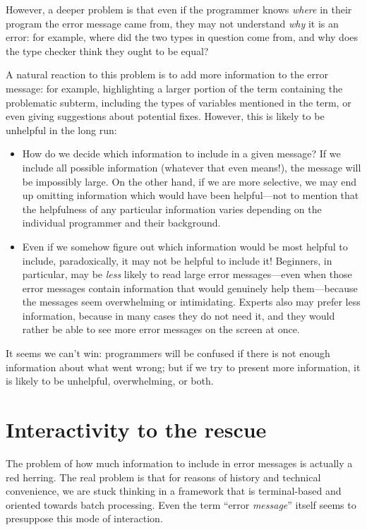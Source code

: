 \documentclass[sigplan, screen]{acmart}\settopmatter{printccs=false,printacmref=false}
\begin{document}
However, a deeper problem is that even if the programmer knows
\emph{where} in their program the error message came from, they may
not understand \emph{why} it is an error: for example, where
did the two types in question come from, and why does the type checker
think they ought to be equal?

A natural reaction to this problem is to add more information to the
error message: for example, highlighting a larger portion of the term
containing the problematic subterm, including the types of variables
mentioned in the term, or even giving suggestions about potential
fixes.  However, this is likely to be unhelpful in the long run:

\begin{itemize}
\item How do we decide which information to include in a given
  message?  If we include all possible information (whatever that even
  means!), the message will be impossibly large. On the other hand, if
  we are more selective, we may end up omitting information which
  would have been helpful---not to mention that the helpfulness of any
  particular information varies depending on the individual programmer
  and their background.
\item Even if we somehow figure out which information would be most
  helpful to include, paradoxically, it may not be helpful to include
  it!  Beginners, in particular, may be \emph{less} likely to read
  large error messages---even when those error messages contain
  information that would genuinely help them---because the messages seem
  overwhelming or intimidating. Experts also may prefer less
  information, because in many cases they do not need it, and they
  would rather be able to see more error messages on the screen at
  once.
\end{itemize}

It seems we can't win: programmers will be confused if there is not enough
information about what went wrong; but if we try to present more
information, it is likely to be unhelpful, overwhelming, or both.

\section{Interactivity to the rescue}

The problem of how much information to include in error messages is
actually a red herring.  The real problem is that for reasons of
history and technical convenience, we are stuck thinking in a
framework that is terminal-based and oriented towards batch
processing.  Even the term ``error \emph{message}'' itself seems to
presuppose this mode of interaction.
\end{document}
